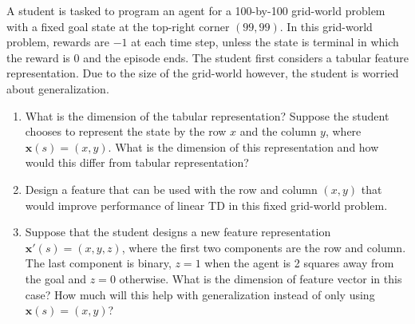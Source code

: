A student is tasked to program an agent for a 100-by-100 grid-world problem with a fixed goal state at the top-right corner $(99,99)$.
In this grid-world problem, rewards are $-1$ at each time step, unless the state is terminal in which the reward is $0$ and the episode ends.
The student first considers a tabular feature representation.
Due to the size of the grid-world however, the student is worried about generalization.

\begin{enumerate}
  \item  What is the dimension of the tabular representation?
    Suppose the student chooses to represent the state by the row $x$ and the column $y$, where $\mathbf{x}(s)=(x,y)$.
    What is the dimension of this representation and how would this differ from tabular representation?
  \item Design a feature that can be used with the row and column $(x,y)$ that would improve performance of linear TD in this fixed grid-world problem.
  \item Suppose that the student designs a new feature representation $\mathbf{x}'(s) = (x,y,z)$, where the first two components are the row and column.
    The last component is binary, $z=1$ when the agent is 2 squares away from the goal and $z= 0$ otherwise.
    What is the dimension of feature vector in this case?
    How much will this help with generalization instead of only using $\mathbf{x}(s) = (x,y)$?
\end{enumerate}

